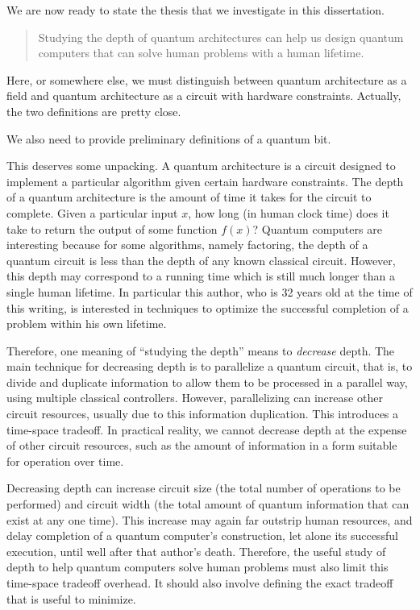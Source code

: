 We are now ready to state the thesis that we investigate in this dissertation.

\begin{quote}
Studying the depth of quantum architectures can help us design quantum computers that can solve
human problems with a human lifetime.
\end{quote}

Here, or somewhere else, we must distinguish between quantum architecture as a field and quantum architecture as a
circuit with hardware constraints. Actually, the two definitions are pretty close.

We also need to provide preliminary definitions of a quantum bit.

This deserves some unpacking. A quantum architecture is a circuit designed to implement a particular algorithm given certain
hardware constraints. The depth of a quantum architecture is the amount of time it takes for the circuit to complete.
Given a particular input $x$, how long (in human clock time) does it take to return the output of some function $f(x)$?
Quantum computers are interesting because for some algorithms, namely factoring, the depth of a quantum circuit is
less than the depth of any known classical circuit. However, this depth may correspond to a running time which is
still much longer than a single human lifetime. In particular this author, who is 32 years old at the time of this
writing, is interested in techniques to optimize the successful completion of a problem within his own lifetime.

Therefore, one meaning of ``studying the depth'' means to \emph{decrease} depth. The main technique for decreasing
depth is to parallelize a quantum circuit, that is, to divide and duplicate information to allow them to be processed
in a parallel way, using multiple classical controllers. However, parallelizing can increase other circuit resources,
usually due to this information duplication. This introduces a time-space tradeoff. In practical reality, we cannot
decrease depth at the expense of other circuit resources, such as the amount of information in a form suitable for
operation over time.

Decreasing depth can increase circuit size (the total number of operations to be performed) and circuit width
(the total amount of quantum information that can exist at any one time). This increase may again far
outstrip human resources, and delay completion of a quantum computer's construction, let alone its
successful execution, until well after that author's death. Therefore, the useful study of depth to help
quantum computers solve human problems must also limit this time-space tradeoff overhead. It should also
involve defining the exact tradeoff that is useful to minimize.

